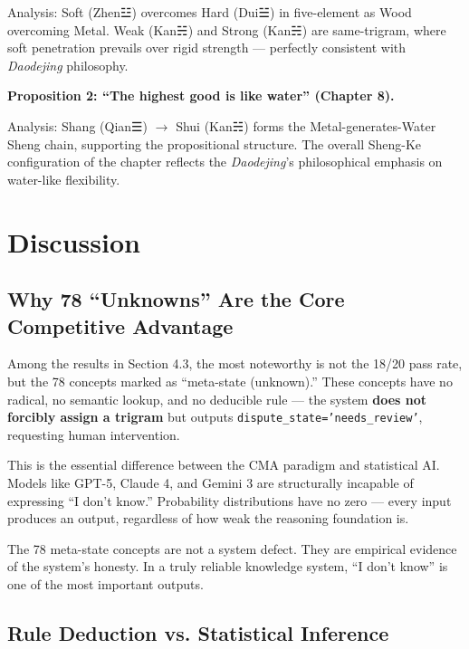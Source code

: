 \documentclass[11pt,a4paper]{article}
\begin{document}
Analysis: Soft (Zhen☳) overcomes Hard (Dui☱) in five-element as Wood overcoming Metal. Weak (Kan☵) and Strong (Kan☵) are same-trigram, where soft penetration prevails over rigid strength — perfectly consistent with \textit{Daodejing} philosophy.

\textbf{Proposition 2: ``The highest good is like water'' (Chapter 8).}

Analysis: Shang (Qian☰) $\rightarrow$ Shui (Kan☵) forms the Metal-generates-Water Sheng chain, supporting the propositional structure. The overall Sheng-Ke configuration of the chapter reflects the \textit{Daodejing}'s philosophical emphasis on water-like flexibility.

\section{Discussion}

\subsection{Why 78 ``Unknowns'' Are the Core Competitive Advantage}

Among the results in Section 4.3, the most noteworthy is not the 18/20 pass rate, but the 78 concepts marked as ``meta-state (unknown).'' These concepts have no radical, no semantic lookup, and no deducible rule — the system \textbf{does not forcibly assign a trigram} but outputs \texttt{dispute\_state='needs\_review'}, requesting human intervention.

This is the essential difference between the CMA paradigm and statistical AI. Models like GPT-5, Claude 4, and Gemini 3 are structurally incapable of expressing ``I don't know.'' Probability distributions have no zero — every input produces an output, regardless of how weak the reasoning foundation is.

The 78 meta-state concepts are not a system defect. They are empirical evidence of the system's honesty. In a truly reliable knowledge system, ``I don't know'' is one of the most important outputs.

\subsection{Rule Deduction vs. Statistical Inference}
\end{document}
